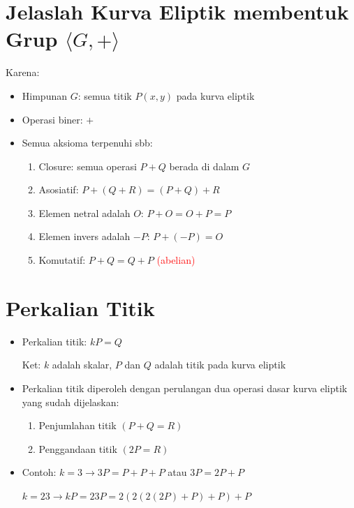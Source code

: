 \documentclass{article}
\begin{document}
\newpage


\section*{Jelaslah Kurva Eliptik membentuk Grup $\langle G, + \rangle$}

Karena:
\begin{itemize}
    \item Himpunan $G$: semua titik $P(x,y)$ pada kurva eliptik
    \item Operasi biner: $+$
    \item Semua aksioma terpenuhi sbb:
    \begin{enumerate}
        \item Closure: semua operasi $P + Q$ berada di dalam $G$
        \item Asosiatif: $P + (Q + R) = (P + Q) + R$
        \item Elemen netral adalah $O$: $P + O = O + P = P$
        \item Elemen invers adalah $-P$: $P + (-P) = O$
        \item Komutatif: $P + Q = Q + P$ \textcolor{red}{(abelian)}
    \end{enumerate}
\end{itemize}

\newpage


\section*{Perkalian Titik}

\begin{itemize}
    \item Perkalian titik: \(kP = Q\)
    
    Ket: \(k\) adalah skalar, \(P\) dan \(Q\) adalah titik pada kurva eliptik
    
    \item Perkalian titik diperoleh dengan perulangan dua operasi dasar kurva eliptik yang sudah dijelaskan:
    \begin{enumerate}
        \item Penjumlahan titik \((P + Q = R)\)
        \item Penggandaan titik \((2P = R)\)
    \end{enumerate}
    
    \item Contoh: \(k = 3 \rightarrow 3P = P + P + P\) atau \(3P = 2P + P\)
    
    \(k = 23 \rightarrow kP = 23P = 2(2(2(2P) + P) + P) + P\)
\end{itemize}
\end{document}
